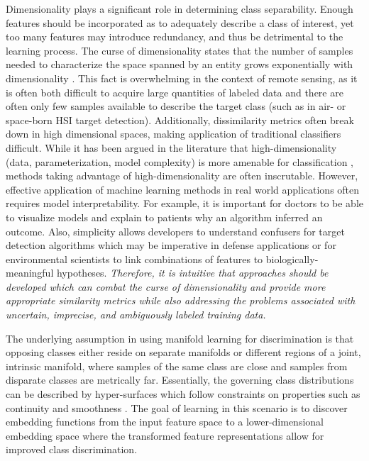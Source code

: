 Dimensionality plays a significant role in determining class separability.  Enough features should be incorporated as to adequately describe a class of interest, yet too many features may introduce redundancy, and thus be detrimental to the learning process. The curse of dimensionality states that the number of samples needed to characterize the space spanned by an entity grows exponentially with dimensionality \citep{Murphy2012, Theodoris2008KPCA}.  This fact is overwhelming in the context of remote sensing, as it is often both difficult to acquire large quantities of labeled data and there are often only few samples available to describe the target class (such as in air- or space-born HSI target detection). Additionally, dissimilarity metrics often break down in high dimensional spaces, making application of traditional classifiers difficult.  While it has been argued in the literature that high-dimensionality (data, parameterization, model complexity) is more amenable for classification \citep{Anderson2014BlessingDimensionalityGaussianMixtures,Breiman2001StatisitcalModeling,Gorban2019BlessingofDimensionality,Huang2019UnderstandingGeneralization}, methods taking advantage of high-dimensionality are often inscrutable.  However, effective application of machine learning methods in real world applications often requires model interpretability.  For example, it is important for doctors to be able to visualize models and explain to patients why an algorithm inferred an outcome.  Also, simplicity allows developers to understand confusers for target detection algorithms which may be imperative in defense applications or for environmental scientists to link combinations of features to biologically-meaningful hypotheses.   \textit{Therefore,  it is intuitive that approaches should be developed which can combat the curse of dimensionality and provide more appropriate similarity metrics while also addressing the problems associated with uncertain, imprecise, and ambiguously labeled training data.}

The underlying assumption in using manifold learning for discrimination is that opposing classes either reside on separate manifolds or different regions of a joint, intrinsic manifold, where samples of the same class are close and samples from disparate classes are metrically far.  Essentially, the governing class distributions can be described by hyper-surfaces which follow constraints on properties such as continuity and smoothness \citep{Belkin2004SemiSupLearningRiemannianManifolds}.  The goal of learning in this scenario is to discover embedding functions from the input feature space to a lower-dimensional embedding space where the transformed feature representations allow for improved class discrimination.


